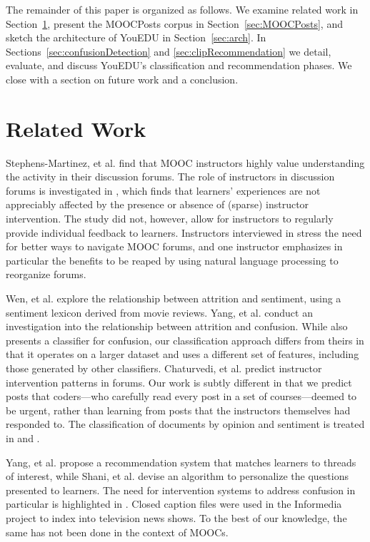 \documentclass{edm_template}
\begin{document}
The remainder of this paper is organized as follows. We examine
related work in Section~\ref{sec:relWork}, present the MOOCPosts corpus in
Section~\ref{sec:MOOCPosts}, and sketch the architecture of YouEDU in
Section~\ref{sec:arch}.  In Sections~\ref{sec:confusionDetection} and
\ref{sec:clipRecommendation} we detail, evaluate, and discuss YouEDU's 
classification and recommendation phases. We close with a section on
future work and a conclusion.

\section{Related Work}
\label{sec:relWork}

Stephens-Martinez, et al. \cite{Stephens-Martinez:2014:MMI:2556325.2566246} find that MOOC instructors highly value understanding the activity in their discussion forums. The role of instructors in discussion forums is investigated in \cite{Tomkin:2014:PMU:2556325.2566245}, which finds that learners' experiences are not appreciably affected by the presence or absence of (sparse) instructor intervention. The study did not, however, allow for instructors to regularly provide individual feedback to learners. Instructors interviewed in \cite{hollands2014moocs} stress the need for better ways to navigate MOOC forums, and one instructor emphasizes in particular the benefits to be reaped by using natural language processing to reorganize forums. 

Wen, et al. \cite{wen2014sentiment} explore the relationship between attrition and sentiment, using a sentiment lexicon derived from movie reviews. Yang, et al. \cite{wen2015confusion} conduct an investigation into the relationship between attrition and confusion. While \cite{wen2015confusion} also presents a classifier for confusion, our classification approach differs from theirs in that it operates on a larger dataset and uses a different set of features, including those generated by other classifiers. Chaturvedi, et al. \cite{chaturvedipredicting} predict instructor intervention patterns in forums. Our work is subtly different in that we predict posts that coders---who carefully read every post in a set of courses---deemed to be urgent, rather than learning from posts that the instructors themselves had responded to. The classification of documents by opinion and sentiment is treated in \cite{song2007opinion} and \cite{binali2009new}. 

Yang, et al. \cite{yang2014forum} propose a recommendation system that matches learners to threads of interest, while Shani, et al. \cite{shaniedurank} devise an algorithm to personalize the questions presented to learners. The need for intervention systems to address confusion in particular is highlighted in \cite{wen2015confusion}. Closed caption files were used in the Informedia project \cite{Wactlar:1996:IAD:619007.620445} to index into television news shows. To the best of our knowledge, the same has not been done in the context of MOOCs. 
\end{document}
